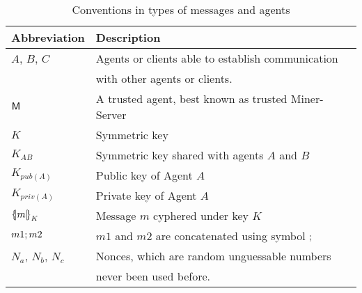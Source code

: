 \begin{table}[htb]
\footnotesize
\begin{center}
\caption{Conventions in types of messages and agents}
\label{table:conventions}
\begin{tabular}{|l|l|}
\hline
{\bf Abbreviation}& {\bf Description}                                   \\\hline\hline
$A$, $B$, $C$       &  Agents or clients able to establish communication  \\
                    &  with other agents or clients.                      \\ 
$\textsf{M}$           &  A trusted agent, best known as trusted Miner-Server      \\
$K$                 &  Symmetric key                                      \\
$K_{AB}$            &  Symmetric key shared with agents $A$ and $B$       \\
$K_{pub(A)}$        &  Public key of Agent $A$                            \\
$K_{priv(A)}$       &  Private key of Agent $A$                           \\
$\fat{m}_{K}$       &  Message $m$ cyphered under key $K$                 \\
$m1; m2$         &  $m1$ and $m2$ are concatenated using symbol $;$ \\
$N_a$, $N_b$, $N_c$ &  Nonces, which are random unguessable numbers      \\
                    &  never been used before.                           \\ \hline \hline
\end{tabular}
\end{center}
\end{table}
\normalsize


